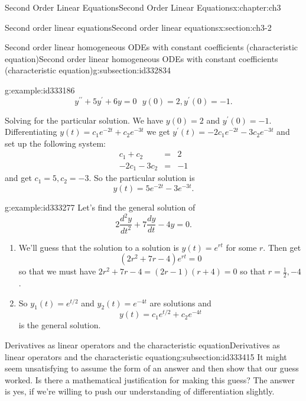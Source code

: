 \documentclass[oneside,10pt,]{book}
\numberwithin{equation}{section}
\numberwithin{equation}{section}
\newcommand{\amp}{&}
\begin{document}
\begin{chapterptx}{Second Order Linear Equations}{}{Second Order Linear Equations}{}{}{x:chapter:ch3}
\begin{sectionptx}{Second order linear equations}{}{Second order linear equations}{}{}{x:section:ch3-2}
\begin{subsectionptx}{Second order linear homogeneous ODEs with constant coefficients (characteristic equation)}{}{Second order linear homogeneous ODEs with constant coefficients (characteristic equation)}{}{}{g:subsection:id332834}
\begin{example}{}{g:example:id333186}
\begin{equation*}
y^{\prime\prime}+5y^{\prime}+6y=0\,\,\,\,y(0)=2,y^{\prime}(0)=-1.
\end{equation*}
%
\par
Solving for the particular solution. We have \(y(0)=2\) and \(y^{\prime}(0)=-1\). Differentiating \(y(t)=c_{1}e^{-2t}+c_{2}e^{-3t}\) we get \(y^{\prime}(t)=-2c_{1}e^{-2t}-3c_{2}e^{-3t}\) and set up the following system:%
\begin{align*}
c_{1}+c_{2} \amp = \amp 2\\
-2c_{1}-3c_{2} \amp = \amp -1
\end{align*}
and get \(c_{1}=5,c_{2}=-3\). So the particular solution is%
\begin{equation*}
y(t)=5e^{-2t}-3e^{-3t}.
\end{equation*}
%
\end{example}
\begin{example}{}{g:example:id333277}%
Let's find the general solution of%
\begin{equation*}
2\frac{d^{2}y}{dt^{2}}+7\frac{dy}{dt}-4y=0.
\end{equation*}
%
%
\begin{enumerate}
\item{}We'll guess that the solution to a solution is \(y(t)=e^{rt}\) for some \(r\). Then get%
\begin{equation*}
\left(2r^{2}+7r-4\right)e^{rt}=0
\end{equation*}
so that we must have \(2r^{2}+7r-4=\left(2r-1\right)\left(r+4\right)=0\) so that \(r=\frac{1}{2},-4\).%
\item{}So \(y_{1}(t)=e^{t/2}\) and \(y_{2}(t)=e^{-4t}\) are solutions and%
\begin{equation*}
y(t)=c_{1}e^{t/2}+c_{2}e^{-4t}
\end{equation*}
is the general solution.%
\end{enumerate}
\end{example}
\end{subsectionptx}
%
%
\typeout{************************************************}
\typeout{************************************************}
%
\begin{subsectionptx}{Derivatives as linear operators and the characteristic equation}{}{Derivatives as linear operators and the characteristic equation}{}{}{g:subsection:id333415}
It might seem unsatisfying to assume the form of an answer and then show that our guess worked. Is there a mathematical justification for making this guess? The answer is yes, if we're willing to push our understanding of differentiation slightly.%

\end{subsectionptx}
\end{sectionptx}
\end{chapterptx}
\end{document}
